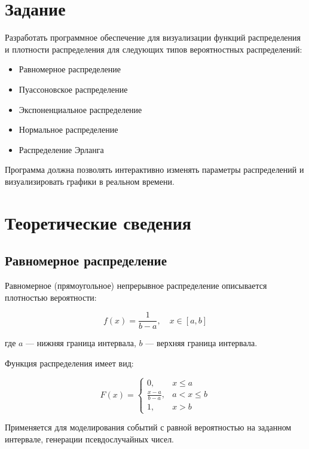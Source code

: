 \section{Задание}

Разработать программное обеспечение для визуализации функций распределения и плотности распределения для следующих типов вероятностных распределений:
\begin{itemize}
    \item Равномерное распределение
    \item Пуассоновское распределение
    \item Экспоненциальное распределение
    \item Нормальное распределение
    \item Распределение Эрланга
\end{itemize}

Программа должна позволять интерактивно изменять параметры распределений и визуализировать графики в реальном времени.

\section{Теоретические сведения}

\subsection{Равномерное распределение}

Равномерное (прямоугольное) непрерывное распределение описывается плотностью вероятности:

\begin{equation}
f(x) = \frac{1}{b-a}, \quad x \in [a,b]
\end{equation}

где $a$ --- нижняя граница интервала, $b$ --- верхняя граница интервала.

Функция распределения имеет вид:

\begin{equation}
F(x) = \begin{cases}
0, & x \leq a \\
\frac{x-a}{b-a}, & a < x \leq b \\
1, & x > b
\end{cases}
\end{equation}

Применяется для моделирования событий с равной вероятностью на заданном интервале, генерации псевдослучайных чисел.

